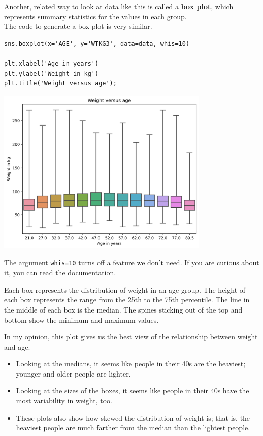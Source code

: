 Another, related way to look at data like this is called a \textbf{box
plot}, which represents summary statistics for the values in each
group.\\
The code to generate a box plot is very similar.

\begin{lstlisting}[]
sns.boxplot(x='AGE', y='WTKG3', data=data, whis=10)

plt.xlabel('Age in years')
plt.ylabel('Weight in kg')
plt.title('Weight versus age');
\end{lstlisting}

\begin{center}
\includegraphics[width=4in]{chapters/09_relationships_files/09_relationships_44_0.png}
\end{center}

The argument \passthrough{\lstinline!whis=10!} turns off a feature we
don't need. If you are curious about it, you can
\href{https://seaborn.pydata.org/generated/seaborn.boxplot.html}{read
the documentation}.

Each box represents the distribution of weight in an age group. The
height of each box represents the range from the 25th to the 75th
percentile. The line in the middle of each box is the median. The spines
sticking out of the top and bottom show the minimum and maximum values.

In my opinion, this plot gives us the best view of the relationship
between weight and age.

\begin{itemize}
\item
  Looking at the medians, it seems like people in their 40s are the
  heaviest; younger and older people are lighter.
\item
  Looking at the sizes of the boxes, it seems like people in their 40s
  have the most variability in weight, too.
\item
  These plots also show how skewed the distribution of weight is; that
  is, the heaviest people are much farther from the median than the
  lightest people.
\end{itemize}

